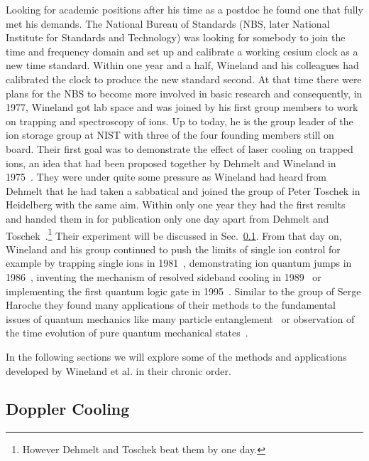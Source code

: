 Looking for academic positions after his time as a postdoc he found one that
fully met his demands. The National Bureau of Standards (NBS, later National
Institute for Standards and Technology) was looking for somebody to join the
time and frequency domain and set up and calibrate a working cesium clock as a new time
standard. Within one year and a half, Wineland and his colleagues had calibrated
the clock to produce the new standard second. At that time there were plans for
the NBS to become more involved in basic research and consequently, in 1977,
Wineland got lab space and was joined by his first group members to work on
trapping and spectroscopy of ions. Up to today, he is the group leader of the
ion storage group at NIST with three of the four founding members still on
board. Their first goal was to demonstrate the
effect of laser cooling on trapped ions, an idea that had been proposed together
by Dehmelt and Wineland in 1975~\cite{wineland1975bullamphys}. They were under
quite some pressure as Wineland had heard from Dehmelt that he had taken a
sabbatical and joined the group of Peter Toschek in Heidelberg with the same
aim. Within only one year they had the first results and handed them in for
publication only one day apart from Dehmelt and
Toschek~\cite{wineland1978radiation, neuhauser1978optical}.\footnote{However
Dehmelt and Toschek beat them by one day.} Their experiment will
be discussed in Sec.~\ref{sec:DopplerCooling}. From that day on, Wineland and
his group continued to push the limits of single ion control for example by trapping
single ions in 1981~\cite{wineland1981spectroscopy}, demonstrating ion quantum
jumps in 1986~\cite{bergquist1986observation}, inventing the mechanism of resolved
sideband cooling in 1989~\cite{diedrich1989laser} or implementing the first quantum
logic gate in 1995~\cite{monroe1995demonstration}. Similar to the group of Serge
Haroche they found many applications of their methods to the fundamental
issues of quantum mechanics like many particle
entanglement~\cite{sackett2000experimental} or observation of the time evolution of
pure quantum mechanical states~\cite{leibfried2003quantum}.

In the following sections we will explore some of the methods and applications
developed by Wineland et al. in their chronic order. 


\subsection{Doppler Cooling}
\label{sec:DopplerCooling}

